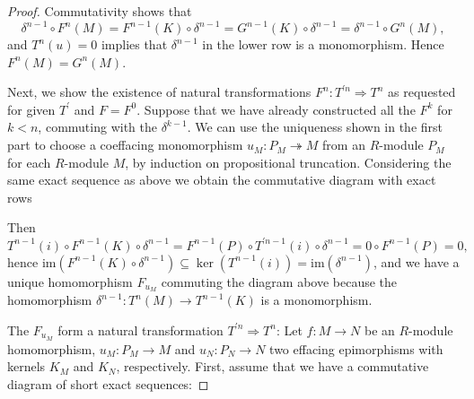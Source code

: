 \documentclass{amsart}
\theoremstyle{plain}
\numberwithin{equation}{section} %
\numberwithin{figure}{section} %
\theoremstyle{plain}
\theoremstyle{plain}
\theoremstyle{plain}
\theoremstyle{plain}
\theoremstyle{plain}
\theoremstyle{plain}
\theoremstyle{remark}
\theoremstyle{remark}
\theoremstyle{remark}
\begin{document}
\begin{proof}
Commutativity shows that
\[ \delta^{n-1} \circ F^n(M) = F^{n-1}(K) \circ \delta^{n-1} = G^{n-1}(K) \circ \delta^{n-1} = \delta^{n-1} \circ G^n(M), \]
and $T^n(u) = 0$ implies that $\delta^{n-1}$ in the lower row is a monomorphism. Hence $F^n(M) = G^n(M)$.

Next, we show the existence of natural transformations $F^n: T^{\prime n} \Rightarrow T^n$ as requested for given $T^\prime$ and $F = F^0$. Suppose that we have already constructed all the $F^k$ for $k < n$, commuting with the $\delta^{k-1}$. We can use the uniqueness shown in the first part to choose a coeffacing monomorphism $u_M: P_M \twoheadrightarrow M$ from an $R$-module $P_M$ for each $R$-module $M$, by induction on propositional truncation. Considering the same exact sequence as above we obtain the commutative diagram with exact rows

\begin{center}
\end{center}

Then 
\[ T^{n-1}(i) \circ F^{n-1}(K) \circ \delta^{n-1} = F^{n-1}(P) \circ T^{\prime n-1}(i) \circ \delta^{n-1} = 0 \circ F^{n-1}(P) = 0, \]
hence $\mathrm{im}(F^{n-1}(K) \circ \delta^{n-1}) \subseteq \ker(T^{n-1}(i)) = \mathrm{im}(\delta^{n-1})$, and we have a unique homomorphism $F_{u_M}$ commuting the diagram above because the homomorphism $\delta^{n-1} : T^n(M) \rightarrow T^{n-1}(K)$ is a monomorphism.

The $F_{u_M}$ form a natural transformation $T^{\prime n} \Rightarrow T^n$: Let $f: M \rightarrow N$ be an $R$-module homomorphism, $u_M: P_M \rightarrow M$ and $u_N: P_N \rightarrow N$ two effacing epimorphisms with kernels $K_M$ and $K_N$, respectively. First, assume that we have a commutative diagram of short exact sequences:


\end{proof}
\end{document}
